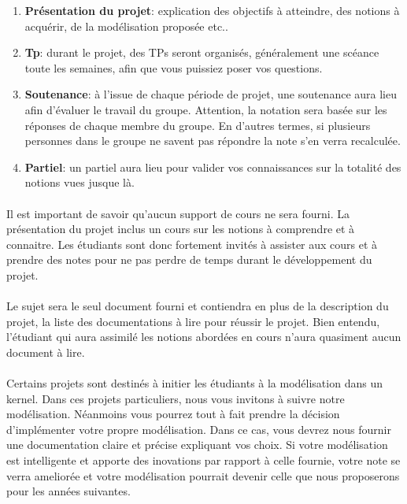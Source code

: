 \documentclass[10pt,a4wide]{article}
\begin{document}
\begin{enumerate}

\item \textbf{Pr\'esentation du projet}: explication des objectifs \`a
      atteindre, des notions \`a acqu\'erir, de la mod\'elisation propos\'ee
      etc..

\item \textbf{Tp}: durant le projet, des TPs seront organis\'es,
      g\'en\'eralement une sc\'eance toute les semaines, afin que vous
      puissiez poser vos questions.

\item \textbf{Soutenance}: \`a l'issue de chaque p\'eriode de projet, une
      soutenance aura lieu afin d'\'evaluer le travail du groupe. Attention,
      la notation sera bas\'ee sur les r\'eponses de chaque membre du groupe.
      En d'autres termes, si plusieurs personnes dans le groupe ne savent
      pas r\'epondre la note s'en verra recalcul\'ee.

\item \textbf{Partiel}: un partiel aura lieu pour valider vos connaissances
      sur la totalit\'e des notions vues jusque l\`a.

\end{enumerate}

\paragraph{}

Il est important de savoir qu'aucun support de cours ne sera fourni. La
pr\'esentation du projet inclus un cours sur les notions \`a comprendre
et \`a connaitre. Les \'etudiants sont donc fortement invit\'es \`a
assister aux cours et \`a prendre des notes pour ne pas perdre de temps
durant le d\'eveloppement du projet.

\paragraph{}

Le sujet sera le seul document fourni et contiendra en plus de la description
du projet, la liste des documentations \`a lire pour r\'eussir le projet.
Bien entendu, l'\'etudiant qui aura assimil\'e les notions abord\'ees en
cours n'aura quasiment aucun document \`a lire.

\paragraph{}

Certains projets sont destin\'es \`a initier les \'etudiants \`a la
mod\'elisation dans un kernel. Dans ces projets particuliers, nous
vous invitons \`a suivre notre mod\'elisation. N\'eanmoins vous
pourrez tout \`a fait prendre la d\'ecision d'impl\'ementer votre
propre mod\'elisation. Dans ce cas, vous devrez nous fournir une documentation
claire et pr\'ecise expliquant vos choix. Si votre mod\'elisation est
intelligente et apporte des inovations par rapport \`a celle fournie,
votre note se verra amelior\'ee et votre mod\'elisation pourrait devenir
celle que nous proposerons pour les ann\'ees suivantes.
\end{document}
